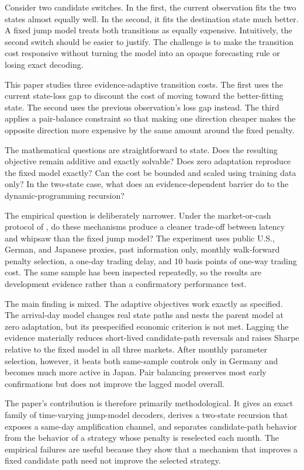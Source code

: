 \documentclass[11pt]{article}
\begin{document}
Consider two candidate switches. In the first, the current observation fits the two states almost equally well. In the second, it fits the destination state much better. A fixed jump model treats both transitions as equally expensive. Intuitively, the second switch should be easier to justify. The challenge is to make the transition cost responsive without turning the model into an opaque forecasting rule or losing exact decoding.

This paper studies three evidence-adaptive transition costs. The first uses the current state-loss gap to discount the cost of moving toward the better-fitting state. The second uses the previous observation's loss gap instead. The third applies a pair-balance constraint so that making one direction cheaper makes the opposite direction more expensive by the same amount around the fixed penalty.

The mathematical questions are straightforward to state. Does the resulting objective remain additive and exactly solvable? Does zero adaptation reproduce the fixed model exactly? Can the cost be bounded and scaled using training data only? In the two-state case, what does an evidence-dependent barrier do to the dynamic-programming recursion?

The empirical question is deliberately narrower. Under the market-or-cash protocol of \citet{shu2024}, do these mechanisms produce a cleaner trade-off between latency and whipsaw than the fixed jump model? The experiment uses public U.S., German, and Japanese proxies, past information only, monthly walk-forward penalty selection, a one-day trading delay, and 10 basis points of one-way trading cost. The same sample has been inspected repeatedly, so the results are development evidence rather than a confirmatory performance test.

The main finding is mixed. The adaptive objectives work exactly as specified. The arrival-day model changes real state paths and nests the parent model at zero adaptation, but its prespecified economic criterion is not met. Lagging the evidence materially reduces short-lived candidate-path reversals and raises Sharpe relative to the fixed model in all three markets. After monthly parameter selection, however, it beats both same-sample controls only in Germany and becomes much more active in Japan. Pair balancing preserves most early confirmations but does not improve the lagged model overall.

The paper's contribution is therefore primarily methodological. It gives an exact family of time-varying jump-model decoders, derives a two-state recursion that exposes a same-day amplification channel, and separates candidate-path behavior from the behavior of a strategy whose penalty is reselected each month. The empirical failures are useful because they show that a mechanism that improves a fixed candidate path need not improve the selected strategy.
\end{document}
